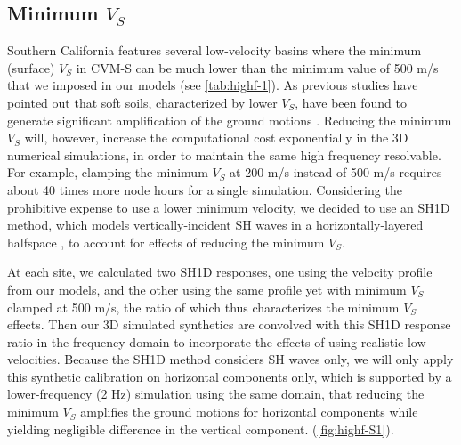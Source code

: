 \subsection{Minimum \textbf{$V_S$}}
Southern California features several low-velocity basins where the minimum (surface) $V_S$ in CVM-S can be much lower than the minimum value of 500 m/s that we imposed in our models (see \cref{tab:highf-1}). As previous studies have pointed out that soft soils, characterized by lower $V_S$, have been found to generate significant amplification of the ground motions . Reducing the minimum $V_S$ will, however, increase the computational cost exponentially in the 3D numerical simulations, in order to maintain the same high frequency resolvable. For example, clamping the minimum $V_S$ at 200 m/s instead of 500 m/s requires about 40 times more node hours for a single simulation. Considering the prohibitive expense to use a lower minimum velocity, we decided to use an SH1D method, which models vertically-incident SH waves in a horizontally-layered halfspace , to account for effects of reducing the minimum $V_S$. 

At each site, we calculated two SH1D responses, one using the velocity profile from our models, and the other using the same profile yet with minimum $V_S$ clamped at 500 m/s, the ratio of which thus characterizes the minimum $V_S$ effects. Then our 3D simulated synthetics are convolved with this SH1D response ratio in the frequency domain to incorporate the effects of using realistic low velocities. Because the SH1D method considers SH waves only, we will only apply this synthetic calibration on horizontal components only, which is supported by a lower-frequency (2 Hz) simulation using the same domain, that reducing the minimum $V_S$ amplifies the ground motions for horizontal components while yielding negligible difference in the vertical component. (\cref{fig:highf-S1}).

